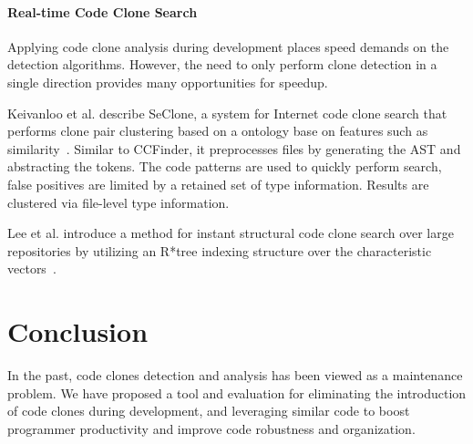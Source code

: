 \documentclass[preprint,10pt]{sigplanconf}
\begin{document}
\paragraph{Real-time Code Clone Search}

Applying code clone analysis during development places speed demands
on the detection algorithms. However, the need to only perform clone
detection in a single direction provides many opportunities for
speedup.

Keivanloo et al. describe SeClone, a system for Internet code clone
search that performs clone pair clustering based on a ontology base on
features such as similarity~\cite{Keivanloo2011}. Similar to CCFinder,
it preprocesses files by generating the AST and abstracting the
tokens. The code patterns are used to quickly perform search, false
positives are limited by a retained set of type information. Results
are clustered via file-level type information.

Lee et al. introduce a method for instant structural code clone search
over large repositories by utilizing an R*tree indexing structure over
the characteristic vectors~\cite{Lee2010}.

\section{Conclusion}

In the past, code clones detection and analysis has been viewed as a
maintenance problem. 
We have proposed a tool and evaluation for
eliminating the introduction of code clones during development, and
leveraging similar code to boost programmer productivity and improve
code robustness and organization.

%

%
%
\end{document}
